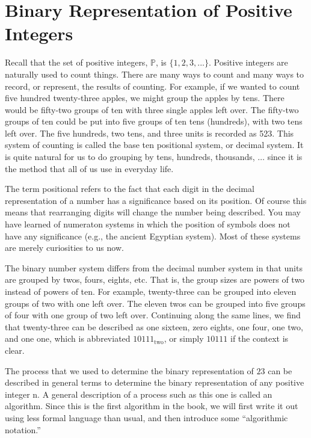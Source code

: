 \documentclass[10pt,]{book}
\theoremstyle{plain}
\theoremstyle{definition}
\begin{document}
\section[Binary Representation of Positive Integers ]{Binary Representation of Positive Integers }\label{Binary_Representation_of_Positive_Integers }
Recall that the set of positive integers, \(\mathbb{P}\), is \(\{1, 2, 3, . . . \}\). Positive integers are naturally used to count things. There are many ways to count and many ways to record, or represent, the results of counting. For example, if we wanted to count five hundred twenty-three apples, we might group the apples by tens. There would be fifty-two groups of ten with three single apples left over. The fifty-two groups of ten could be put into five groups of ten tens (hundreds), with two tens left over. The five hundreds, two tens, and three units is recorded as 523. This system of counting is called the base ten positional system, or decimal system. It is quite natural for us to do grouping by tens, hundreds, thousands, \(\dots\) since it is the method that all of us use in everyday life. %
\par
 The term positional refers to the fact that each digit in the decimal representation of a number has a significance based on its position. Of course this means that rearranging digits will change the number being described. You may have learned of numeraton systems in which the position of symbols does not have any significance (e.g., the ancient Egyptian system). Most of these systems are merely curiosities to us now.%
\par
The binary number system differs from the decimal number system in that units are grouped by twos, fours, eights, etc. That is, the group sizes are powers of two instead of powers of ten. For example, twenty-three can be grouped into eleven groups of two with one left over. The eleven twos can be grouped into five groups of four with one group of two left over. Continuing along the same lines, we find that twenty-three can be described as one sixteen, zero eights, one four, one two, and one one, which is abbreviated \(10111_{\textrm{two}}\), or simply \(10111\) if the
context is clear. %
\par
The process that we used to determine the binary representation of \(23\) can be described in general terms to determine the binary representation of any positive integer n. A general description of a process such as this one is called an algorithm. Since this is the first algorithm in the book, we will first write it out using less formal language than usual, and then introduce some ``algorithmic notation.''%
\end{document}
